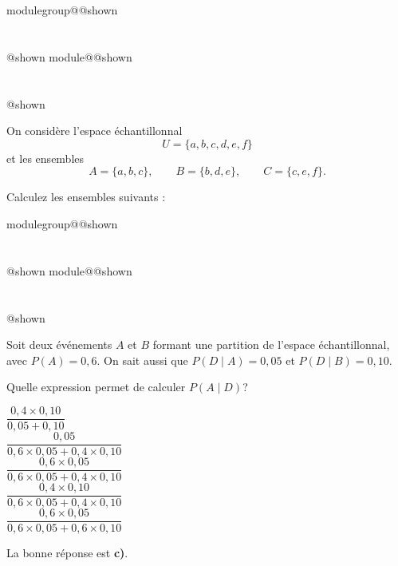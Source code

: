 \documentclass{Evaluation}
\makeatletter
\newcommand{\currentmodulekey}{}
\newcommand{\currentmoduletitle}{}
\newcommand{\currentgroupkey}{}
\newcommand{\currentgrouptitle}{}
\newcommand{\showmoduleifneeded}{%
  \ifx\currentgroupkey\empty\else
    \expandafter\ifx\csname modulegroup@\currentgroupkey @shown\endcsname\relax
      \section*{\currentgrouptitle}%
      \expandafter\gdef\csname modulegroup@\currentgroupkey @shown\endcsname{1}%
    \fi
  \fi
  \expandafter\ifx\csname module@\currentmodulekey @shown\endcsname\relax
    \section*{\currentmoduletitle}%
    \expandafter\gdef\csname module@\currentmodulekey @shown\endcsname{1}%
  \fi
}
\newenvironment{H26}{\showmoduleifneeded}{}
\newenvironment{H26r}{\showmoduleifneeded}{}
\makeatother
\begin{document}
\begin{questions}
\begin{H26}
\question {} %

On considère l’espace échantillonnal
\[
U = \{a,b,c,d,e,f\}
\]
et les ensembles
\[
A = \{a,b,c\}, \qquad
B = \{b,d,e\}, \qquad
C = \{c,e,f\}.
\]

Calculez les ensembles suivants :\\
\end{H26}

\begin{H26r}
\question {} %
Soit deux événements $A$ et $B$ formant une partition de l'espace échantillonnal, avec $P(A)=0{,}6$. On sait aussi que $P(D\mid A)=0{,}05$ et $P(D\mid B)=0{,}10$.

Quelle expression permet de calculer $P(A\mid D)$?\\

\begin{checkboxes}
\choice $\dfrac{0{,}4\times 0{,}10}{0{,}05+0{,}10}$\\[4pt]
\choice $\dfrac{0{,}05}{0{,}6\times 0{,}05+0{,}4\times 0{,}10}$\\[4pt]
\correctchoice $\dfrac{0{,}6\times 0{,}05}{0{,}6\times 0{,}05+0{,}4\times 0{,}10}$\\[4pt]
\choice $\dfrac{0{,}4\times 0{,}10}{0{,}6\times 0{,}05+0{,}4\times 0{,}10}$\\[4pt]
\choice $\dfrac{0{,}6\times 0{,}05}{0{,}6\times 0{,}05+0{,}6\times 0{,}10}$
\end{checkboxes}

\begin{solution}
La bonne réponse est \textbf{c)}.


\end{solution}
\end{H26r}
\end{questions}
\end{document}

